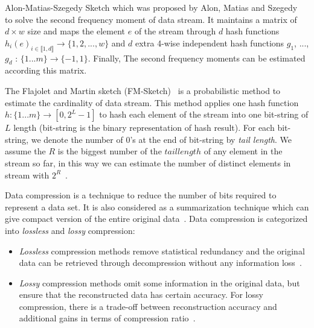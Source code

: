 Alon-Matias-Szegedy Sketch which was proposed by Alon, Matias and
Szegedy~\cite{alon1999space} to solve the second frequency moment of data
stream. It maintains a matrix of $d\times{w}$ size and maps the element $e$ of
the stream through $d$ hash functions $h_{i}(e)_{i\in \llbracket 1, d
\rrbracket} \rightarrow \{1, 2, ..., w\}$ and $d$ extra 4-wise independent hash
functions $g_1$, ..., $g_d$ : $\{1...m\}\rightarrow \{-1, 1\}$. Finally, The
second frequency moments can be estimated according this matrix.

The Flajolet and Martin sketch (FM-Sketch)~\cite{flajolet1985probabilistic} is a
probabilistic method to estimate the cardinality of data stream. This method
applies one hash function $h: \{1...m\}\rightarrow [0,2^{L}-1]$ to hash each
element of the stream into one bit-string of $L$ length (bit-string is the
binary representation of hash result). For each bit-string, we denote the number
of 0's at the end of bit-string by \emph{tail length}. We assume the $R$ is the
biggest number of the $tail length$ of any element in the stream so far, in this
way we can estimate the number of distinct elements in stream with
$2^R$~\cite{flajolet1985probabilistic, garofalakis2016data}.



Data compression is a technique to reduce the number of bits required to
represent a data set. It is also considered as a summarization technique
which can give compact version of the entire original
data~\cite{hesabi2015data}. Data compression is categorized into
\emph{lossless} and \emph{lossy} compression:
\begin{itemize}
    \item \emph{Lossless} compression methods remove statistical redundancy and
    the original data can be retrieved through decompression without any
    information loss~\cite{hesabi2015data}.
    \item \emph{Lossy} compression methods omit some information in the
    original data, but ensure that the reconstructed data has certain accuracy. For
    lossy compression, there is a trade-off between reconstruction accuracy and
    additional gains in terms of compression ratio~\cite{zordan2014performance}.
\end{itemize}

